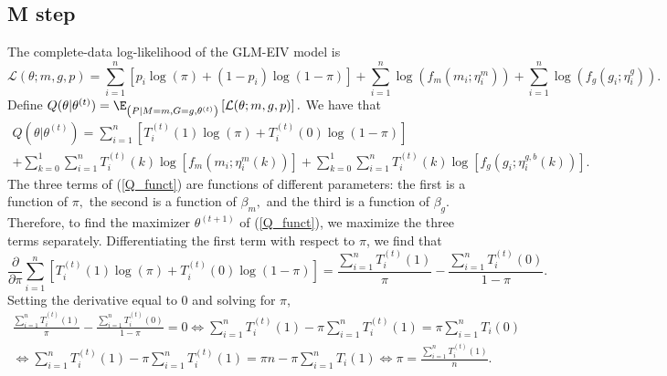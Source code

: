 \documentclass[11pt]{article}
\begin{document}
\begin{appendices}
\begin{refsection}
\subsection*{M step}
The complete-data log-likelihood of the GLM-EIV model  is
\begin{equation}\label{full_log_lik}
\mathcal{L}(\theta; m, g, p) = \sum_{i=1}^n \left[ p_i \log(\pi) + (1-p_i) \log(1-\pi) \right] + \sum_{i=1}^n \log\left( f_m(m_i; \eta^m_i)\right) + \sum_{i=1}^n \log\left( f_g(g_i; \eta_i^g) \right).
\end{equation}
Define $Q(\theta | \theta^{(t)}) = \E_{\left(P |M = m, G = g, \theta^{(t)}\right)}\left[ \mathcal{L}(\theta; m, g, p) \right].$ We have that
\begin{multline}\label{Q_funct}
Q(\theta |\theta^{(t)}) = \sum_{i=1}^n \left[T^{(t)}_i(1)\log(\pi) + T_i^{(t)}(0) \log(1 - \pi)\right] \\ + \sum_{k=0}^1 \sum_{i=1}^n T^{(t)}_i(k) \log \left[ f_m(m_i; \eta_i^m(k)) \right] + \sum_{k=0}^1 \sum_{i=1}^n T^{(t)}_i(k) \log \left[ f_g( g_i; \eta^{g,b}_i(k)) \right].
\end{multline}
The three terms of (\ref{Q_funct}) are functions of different parameters: the first is a function of $\pi,$ the second is a function of $\beta_m,$ and the third is a function of $\beta_g$. Therefore, to find the maximizer $\theta^{(t+1)}$ of (\ref{Q_funct}), we maximize the three terms separately. Differentiating the first term with respect to $\pi$, we find that
\begin{equation*}
\frac{ \partial }{\partial \pi } \sum_{i=1}^n \left[ T^{(t)}_i(1)\log(\pi) + T_i^{(t)}(0) \log(1 - \pi)\right]  = \frac{\sum_{i=1}^n T_i^{(t)}(1)}{\pi} - \frac{ \sum_{i=1}^n T_i^{(t)}(0) }{ 1 - \pi}.
\end{equation*} Setting the derivative equal to $0$ and solving for $\pi$,
\begin{multline*}
\frac{\sum_{i=1}^n T_i^{(t)}(1)}{\pi} - \frac{ \sum_{i=1}^n T_i^{(t)}(0) }{ 1 - \pi} = 0 \iff \sum_{i=1}^n T_i^{(t)}(1) - \pi \sum_{i=1}^n T^{(t)}_i(1) = \pi \sum_{i=1}^n T_i(0) \\ \iff \sum_{i=1}^n T^{(t)}_i(1) - \pi\sum_{i=1}^n T_i^{(t)}(1) = \pi n - \pi\sum_{i=1}^n T_i(1) \iff \pi = \frac{ \sum_{i=1}^n T_i^{(t)} (1) }{n}.\end{multline*}

\end{refsection}
\end{appendices}
\end{document}
